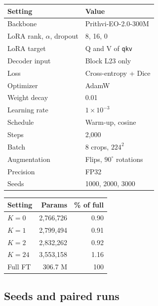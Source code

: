 \documentclass[11pt,a4paper]{report}
\begin{document}
\begin{table}[t]
\centering
\begin{minipage}[t]{0.52\textwidth}
\centering
{}
\label{tab:hyperparams}
\small
\begin{tabular}{@{}ll@{}}
\toprule
\textbf{Setting} & \textbf{Value} \\
\midrule
Backbone & Prithvi-EO-2.0-300M \\
LoRA rank, $\alpha$, dropout & 8, 16, 0 \\
LoRA target & Q and V of \texttt{qkv} \\
Decoder input & Block L23 only \\
Loss & Cross-entropy + Dice \\
Optimizer & AdamW \\
Weight decay & 0.01 \\
Learning rate & $1 \times 10^{-3}$ \\
Schedule & Warm-up, cosine \\
Steps & 2,000 \\
Batch & 8 crops, $224^2$ \\
Augmentation & Flips, $90^\circ$ rotations \\
Precision & FP32 \\
Seeds & 1000, 2000, 3000 \\
\bottomrule
\end{tabular}
\end{minipage}\hfill
\begin{minipage}[t]{0.45\textwidth}
\centering
{}
\label{tab:params}
\small
\begin{tabular}{@{}lrr@{}}
\toprule
\textbf{Setting} & \textbf{Params} & \textbf{\% of full} \\
\midrule
$K = 0$ & 2,766,726 & 0.90 \\
$K = 1$ & 2,799,494 & 0.91 \\
$K = 2$ & 2,832,262 & 0.92 \\
$K = 24$ & 3,553,158 & 1.16 \\
Full FT & 306.7 M & 100 \\
\bottomrule
\end{tabular}
\end{minipage}
\end{table}

\subsection{Seeds and paired runs}
\end{document}
